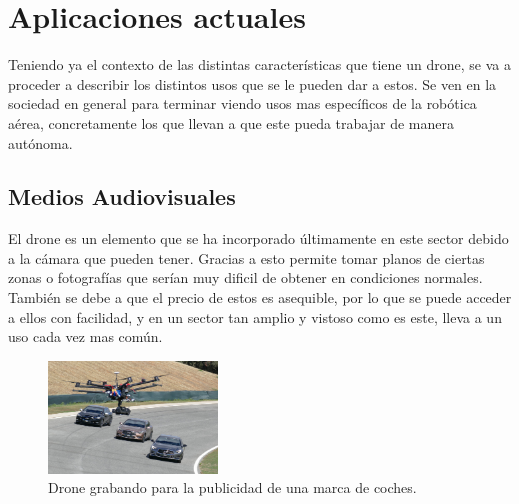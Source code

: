 \section{Aplicaciones actuales }
\hspace{1 cm} Teniendo ya el contexto de las distintas caracter\'isticas que tiene un drone, se va a proceder a describir los distintos usos que se le pueden dar a estos. Se ven en la sociedad en general para terminar viendo usos mas espec\'ificos de la rob\'otica a\'erea, concretamente los que llevan a que este pueda trabajar de manera aut\'onoma. 

\subsection{Medios Audiovisuales}
\hspace{1 cm} El drone es un elemento que se ha incorporado \'ultimamente en este sector debido a la c\'amara que pueden tener. Gracias a esto permite tomar planos de ciertas zonas o fotograf\'ias que ser\'ian muy dificil de obtener en condiciones normales. Tambi\'en se debe a que el precio de estos es asequible, por lo que se puede acceder a ellos con facilidad, y en un sector tan amplio y vistoso como es este, lleva a un uso cada vez mas com\'un.
\begin{figure}[H]
	\centering
		\includegraphics[width=0.4\textwidth]{imgs/anuncio_television.jpg}
				\caption{Drone grabando para la publicidad de una marca de coches.}
	\label{fig:Drone grabando publicidad.}
\end{figure}


